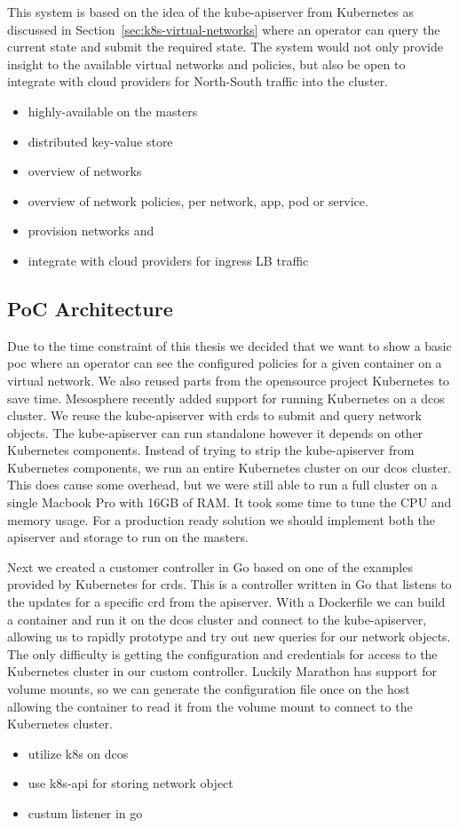 This system is based on the idea of the kube-apiserver from Kubernetes as discussed in Section~\ref{sec:k8s-virtual-networks} where an operator can query the current state and submit the required state. The system would not only provide insight to the available virtual networks and policies, but also be open to integrate with cloud providers for North-South traffic into the cluster.

\begin{itemize}
    \item highly-available on the masters
    \item distributed key-value store
    \item overview of networks
    \item overview of network policies, per network, app, pod or service.
    \item provision networks and 
    \item integrate with cloud providers for ingress LB traffic
\end{itemize}

\subsection{PoC Architecture}
\label{subsec:poc-architecture}
Due to the time constraint of this thesis we decided that we want to show a basic \gls{poc} where an operator can see the configured policies for a given container on a virtual network. We also reused parts from the opensource project Kubernetes to save time. Mesosphere recently added support for running Kubernetes on a \gls{dcos} cluster. We reuse the kube-apiserver with \glspl{crd} to submit and query network objects. The kube-apiserver can run standalone however it depends on other Kubernetes components. Instead of trying to strip the kube-apiserver from Kubernetes components, we run an entire Kubernetes cluster on our \gls{dcos} cluster. This does cause some overhead, but we were still able to run a full cluster on a single Macbook Pro with 16GB of RAM. It took some time to tune the CPU and memory usage. For a production ready solution we should implement both the apiserver and storage to run on the masters.

Next we created a customer controller in Go based on one of the examples provided by Kubernetes for \glspl{crd}. This is a controller written in Go that listens to the updates for a specific \gls{crd} from the apiserver. With a Dockerfile we can build a container and run it on the \gls{dcos} cluster and connect to the kube-apiserver, allowing us to rapidly prototype and try out new queries for our network objects. The only difficulty is getting the configuration and credentials for access to the Kubernetes cluster in our custom controller. Luckily Marathon has support for volume mounts, so we can generate the configuration file once on the host allowing the container to read it from the volume mount to connect to the Kubernetes cluster.

\begin{itemize}
    \item utilize k8s on dcos
    \item use k8s-api for storing network object
    \item custum listener in go
\end{itemize}
